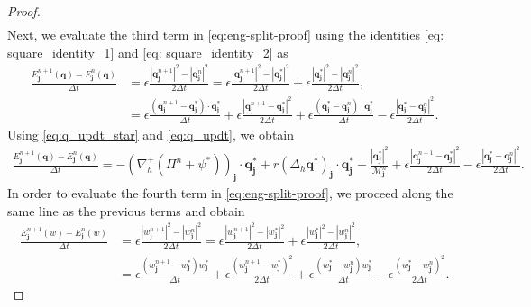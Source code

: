 \documentclass[11pt]{article}
\numberwithin{equation}{section}
\newtheorem{counter example}[theorem]{Counter Example}
\numberwithin{equation}{section}
\numberwithin{equation}{section}
\begin{document}
\begin{proof}
\begin{equation}
\begin{aligned}
\end{aligned}
\end{equation}
Next, we evaluate the third term in \eqref{eq:eng-split-proof} using the identities \eqref{eq: square_identity_1} and \eqref{eq: square_identity_2} as
\begin{align*}
\frac{E_{\mathbf{j}}^{n+1}(\mathbf{q})-E_{\mathbf{j}}^{n}(\mathbf{q})}{\Delta t}&=\epsilon\frac{|\mathbf{q}_{\mathbf{j}}^{n+1}|^2-|\mathbf{q}_{\mathbf{j}}^{n}|^2}{2\Delta t}=\epsilon\frac{|\mathbf{q}_{\mathbf{j}}^{n+1}|^2-|\mathbf{q}_{\mathbf{j}}^{*}|^2}{2\Delta t}+\epsilon\frac{|\mathbf{q}_{\mathbf{j}}^{*}|^2-|\mathbf{q}_{\mathbf{j}}^{n}|^2}{2\Delta t},\\
&=\epsilon\frac{(\mathbf{q}_{\mathbf{j}}^{n+1}-\mathbf{q}_{\mathbf{j}}^{*})\cdot\mathbf{q}_{\mathbf{j}}^{*}}{\Delta t}+\epsilon\frac{|\mathbf{q}_{\mathbf{j}}^{n+1}-\mathbf{q}_{\mathbf{j}}^{*}|^2}{2\Delta t}+\epsilon\frac{(\mathbf{q}_{\mathbf{j}}^{*}-\mathbf{q}_{\mathbf{j}}^{n})\cdot \mathbf{q}_{\mathbf{j}}^{*}}{\Delta t}-\epsilon\frac{|\mathbf{q}_{\mathbf{j}}^{*}-\mathbf{q}_{\mathbf{j}}^{n}|^2}{2\Delta t}.
\end{align*}
Using \eqref{eq:q_updt_star} and \eqref{eq:q_updt}, we obtain 
\begin{equation}
\begin{aligned}
\label{eq:q-energy-proof}
\frac{E_{\mathbf{j}}^{n+1}(\mathbf{q})-E_{\mathbf{j}}^{n}(\mathbf{q})}{\Delta t}=-(\nabla_h^+(\Pi^n+\psi^*))_{\mathbf{j}}\cdot \mathbf{q}^*_{\mathbf{j}}+ r(\Delta_{h} \mathbf{q}^*)_{\mathbf{j}}\cdot \mathbf{q}^*_{\mathbf{j}}-\frac{|\mathbf{q}_{j}^{*}|^2}{\mathcal{M}_{\mathbf{j}}^n}+\epsilon\frac{|\mathbf{q}_{\mathbf{j}}^{n+1}-\mathbf{q}_{\mathbf{j}}^{*}|^2}{2\Delta t}-\epsilon\frac{|\mathbf{q}_{\mathbf{j}}^{*}-\mathbf{q}_{\mathbf{j}}^{n}|^2}{2\Delta t}.
\end{aligned}
\end{equation}
In order to evaluate the fourth term in \eqref{eq:eng-split-proof}, we proceed along the same line as the previous terms and obtain
\begin{align*}
\frac{E_{\mathbf{j}}^{n+1}(w)-E_{\mathbf{j}}^{n}(w)}{\Delta t}&=\epsilon\frac{|w_{\mathbf{j}}^{n+1}|^2-|w_{\mathbf{j}}^{n}|^2}{2\Delta t}=\epsilon\frac{|w_{\mathbf{j}}^{n+1}|^2-|w_{\mathbf{j}}^{*}|^2}{2\Delta t}+\epsilon\frac{|w_{\mathbf{j}}^{*}|^2-|w_{\mathbf{j}}^{n}|^2}{2\Delta t},\\
&=\epsilon\frac{(w_{\mathbf{j}}^{n+1}-w_{\mathbf{j}}^{*})w_{\mathbf{j}}^{*}}{\Delta t}+\epsilon\frac{(w_{\mathbf{j}}^{n+1}-w_{\mathbf{j}}^{*})^2}{2\Delta t}+\epsilon\frac{(w_{\mathbf{j}}^{*}-w_{\mathbf{j}}^{n})w_{\mathbf{j}}^*}{\Delta t}-\epsilon\frac{(w_{\mathbf{j}}^{*}-w_{\mathbf{j}}^{n})^2}{2\Delta t}.

\end{align*}
\end{proof}
\end{document}
